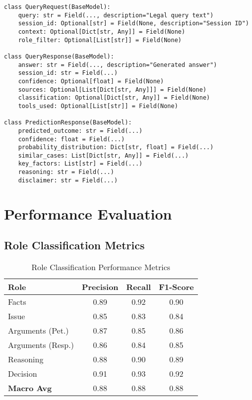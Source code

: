 \documentclass[12pt,a4paper]{article}
\begin{document}
\begin{lstlisting}[caption={Pydantic Data Models}]
class QueryRequest(BaseModel):
    query: str = Field(..., description="Legal query text")
    session_id: Optional[str] = Field(None, description="Session ID")
    context: Optional[Dict[str, Any]] = Field(None)
    role_filter: Optional[List[str]] = Field(None)

class QueryResponse(BaseModel):
    answer: str = Field(..., description="Generated answer")
    session_id: str = Field(...)
    confidence: Optional[float] = Field(None)
    sources: Optional[List[Dict[str, Any]]] = Field(None)
    classification: Optional[Dict[str, Any]] = Field(None)
    tools_used: Optional[List[str]] = Field(None)

class PredictionResponse(BaseModel):
    predicted_outcome: str = Field(...)
    confidence: float = Field(...)
    probability_distribution: Dict[str, float] = Field(...)
    similar_cases: List[Dict[str, Any]] = Field(...)
    key_factors: List[str] = Field(...)
    reasoning: str = Field(...)
    disclaimer: str = Field(...)
\end{lstlisting}

\section{Performance Evaluation}

\subsection{Role Classification Metrics}

\begin{table}[H]
\centering
\begin{tabular}{|l|c|c|c|}
\hline
\textbf{Role} & \textbf{Precision} & \textbf{Recall} & \textbf{F1-Score} \\
\hline
Facts & 0.89 & 0.92 & 0.90 \\
Issue & 0.85 & 0.83 & 0.84 \\
Arguments (Pet.) & 0.87 & 0.85 & 0.86 \\
Arguments (Resp.) & 0.86 & 0.84 & 0.85 \\
Reasoning & 0.88 & 0.90 & 0.89 \\
Decision & 0.91 & 0.93 & 0.92 \\
\hline
\textbf{Macro Avg} & 0.88 & 0.88 & 0.88 \\
\hline
\end{tabular}
\caption{Role Classification Performance Metrics}
\end{table}
\end{document}
